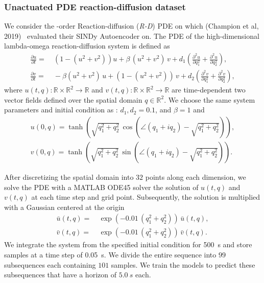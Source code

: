 \subsubsection{Unactuated PDE reaction-diffusion dataset}\label{ssub:con:reaction_diffusion_dataset}
 We consider the -order Reaction-diffusion (\emph{R-D}) \gls{PDE} on which (Champion et al, 2019)~\citep{champion2019data} evaluated their SINDy Autoencoder on. The \gls{PDE} of the high-dimensional lambda-omega reaction-diffusion system is defined as
\begin{equation}
\begin{split}
    \frac{\partial u}{\partial t} =& \: \left ( 1 - (u^2 + v^2) \right ) u + \beta \, (u^2 + v^2) \, v + d_1 \left ( \frac{\partial^2 u}{\partial q_1^2} + \frac{\partial^2 u}{\partial q_2^2} \right ),\\
    \frac{\partial v}{\partial t} =& \: -\beta (u^2 + v^2) \, u + (1 - (u^2 + v^2)) \, v + d_2 \left ( \frac{\partial^2 v}{\partial q_1^2} + \frac{\partial^2 v}{\partial q_2^2} \right ),
\end{split}
\end{equation}
where $u(t,q): \mathbb{R} \times \mathbb{R}^2 \to \mathbb{R}$ and $v(t,q): \mathbb{R} \times \mathbb{R}^2 \to \mathbb{R}$ are time-dependent two vector fields defined over the spatial domain $q \in \mathbb{R}^2$.
We choose the same system parameters and initial condition as \citet{champion2019data}: $d_1, d_2 = 0.1$, and $\beta = 1$ and 
\begin{equation}
\begin{split}
    u(0,q) = \tanh \left ( \sqrt{q_1^2 + q_2^2} \, \cos \left ( \angle (q_1 + i q_2) - \sqrt{q_1^2 + q_2^2} \right ) \right ),\\
    v(0,q) = \tanh \left ( \sqrt{q_1^2 + q_2^2} \, \sin \left ( \angle (q_1 + i q_2) - \sqrt{q_1^2 + q_2^2} \right ) \right ).
\end{split}
\end{equation}

After discretizing the spatial domain into $32$ points along each dimension, we solve the \gls{PDE} with a MATLAB ODE45 solver the solution of $u(t,q)$ and $v(t,q)$ at each time step and grid point.
Subsequently, the solution is multiplied with a Gaussian centered at the origin~\citep{champion2019data}
\begin{equation}
\begin{split}
    \bar{u}(t,q) =& \: \exp(-0.01 \, (q_1^2 + q_2^2)) \, \bar{u}(t,q),\\
    \bar{v}(t,q) =& \: \exp(-0.01 \, (q_1^2 + q_2^2)) \, \bar{v}(t,q).
\end{split}
\end{equation}
We integrate the system from the specified initial condition for \SI{500}{s} and store samples at a time step of \SI{0.05}{s}. We divide the entire sequence into $99$ subsequences each containing $101$ samples. We train the models to predict these subsequences that have a horizon of $\SI{5.0}{s}$ each.

